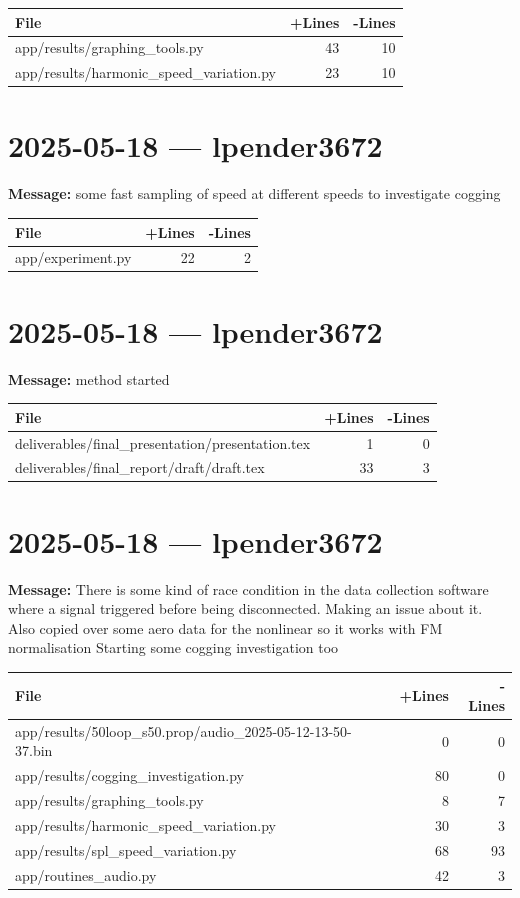 \documentclass{article}
\begin{document}
\begin{longtable}{|p{10cm}|r|r|}
\hline \textbf{File} & \textbf{+Lines} & \textbf{-Lines} \\
\hline
app/results/graphing\_tools.py & 43 & 10 \\
\hline
app/results/harmonic\_speed\_variation.py & 23 & 10 \\
\hline
\end{longtable}

\section*{2025-05-18 --- lpender3672}
\textbf{Message:} some fast sampling of speed at different speeds to investigate cogging

\begin{longtable}{|p{10cm}|r|r|}
\hline \textbf{File} & \textbf{+Lines} & \textbf{-Lines} \\
\hline
app/experiment.py & 22 & 2 \\
\hline
\end{longtable}

\section*{2025-05-18 --- lpender3672}
\textbf{Message:} method started

\begin{longtable}{|p{10cm}|r|r|}
\hline \textbf{File} & \textbf{+Lines} & \textbf{-Lines} \\
\hline
deliverables/final\_presentation/presentation.tex & 1 & 0 \\
\hline
deliverables/final\_report/draft/draft.tex & 33 & 3 \\
\hline
\end{longtable}

\section*{2025-05-18 --- lpender3672}
\textbf{Message:} There is some kind of race condition in the data collection software where a signal triggered before being disconnected. Making an issue about it. Also copied over some aero data for the nonlinear so it works with FM normalisation Starting some cogging investigation too

\begin{longtable}{|p{10cm}|r|r|}
\hline \textbf{File} & \textbf{+Lines} & \textbf{-Lines} \\
\hline
app/results/50loop\_s50.prop/audio\_2025-05-12-13-50-37.bin & 0 & 0 \\
\hline
app/results/cogging\_investigation.py & 80 & 0 \\
\hline
app/results/graphing\_tools.py & 8 & 7 \\
\hline
app/results/harmonic\_speed\_variation.py & 30 & 3 \\
\hline
app/results/spl\_speed\_variation.py & 68 & 93 \\
\hline
app/routines\_audio.py & 42 & 3 \\
\hline
\end{longtable}
\end{document}
